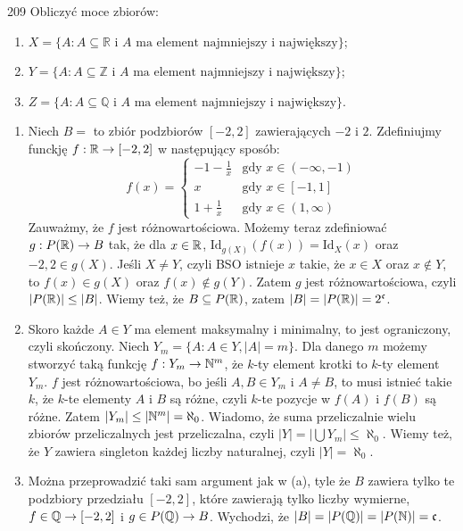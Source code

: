 \documentclass{../note}
\begin{document}
\begin{zadanie}{209}
Obliczyć moce zbiorów:
\begin{enumerate}[label=(\alph*)]
    \item $X=\{A : A \subseteq \mathbb{R} \text{ i } A \text{ ma element najmniejszy i największy}\}$;
    \item $Y=\{A : A \subseteq \mathbb{Z} \text{ i } A \text{ ma element najmniejszy i największy}\}$;
    \item $Z=\{A : A \subseteq \mathbb{Q} \text{ i } A \text{ ma element najmniejszy i największy}\}$.
\end{enumerate}
\end{zadanie}
\begin{rozwiazanie}
\begin{enumerate}[label=(\alph*)]
    \item Niech $B = $ to zbiór podzbiorów $[-2, 2]$ zawierających $-2$ i $2$. Zdefiniujmy funckję $f : \mathbb{R} \to [-2, 2]$ w następujący sposób:
    \[f(x) = \begin{cases}
        -1 - \frac1x & \text{gdy } x \in (-\infty, -1) \\
        x & \text{gdy } x \in [-1, 1] \\
        1 + \frac1x & \text{gdy } x \in (1, \infty)
    \end{cases}\]
    Zauważmy, że $f$ jest różnowartościowa. Możemy teraz zdefiniować $g : P(\mathbb{R}) \to B$ tak, że dla $x \in \mathbb{R}$, $\text{Id}_{g(X)}(f(x)) = \text{Id}_{X}(x)$ oraz $-2, 2 \in g(X)$. Jeśli $X \neq Y$, czyli BSO istnieje $x$ takie, że $x \in X $ oraz $x \notin Y$, to $f(x) \in g(X)$ oraz $f(x) \notin g(Y)$. Zatem $g$ jest różnowartościowa, czyli $|P(\mathbb{R})| \leq |B|$. Wiemy też, że $B \subseteq P(\mathbb{R})$, zatem $|B| = |P(\mathbb{R})| = 2^{\mathfrak{c}}$.
    \item Skoro każde $A \in Y$ ma element maksymalny i minimalny, to jest ograniczony, czyli skończony. Niech $Y_m = \{A : A \in Y, |A| = m\}$. Dla danego $m$ możemy stworzyć taką funkcję $f : Y_m \to \mathbb{N}^m$, że $k$-ty element krotki to $k$-ty element $Y_m$. $f$ jest różnowartościowa, bo jeśli $A, B \in Y_m$ i $A \neq B$, to musi istnieć takie $k$, że $k$-te elementy $A$ i $B$ są różne, czyli $k$-te pozycje w $f(A)$ i $f(B)$ są różne. Zatem $|Y_m| \leq |\mathbb{N}^m| = \aleph_0$. Wiadomo, że suma przeliczalnie wielu zbiorów przeliczalnych jest przeliczalna, czyli $|Y| = |\bigcup Y_m| \leq \aleph_0$. Wiemy też, że $Y$ zawiera singleton każdej liczby naturalnej, czyli $|Y| = \aleph_0$.
    \item Można przeprowadzić taki sam argument jak w (a), tyle że $B$ zawiera tylko te podzbiory przedziału $[-2, 2]$, które zawierają tylko liczby wymierne, $f \in \mathbb{Q} \to [-2, 2]$ i $g \in P(\mathbb{Q}) \to B$. Wychodzi, że $|B| = |P(\mathbb{Q})| = |P(\mathbb{N})| = \mathfrak{c}$.
\end{enumerate}
\end{rozwiazanie}
\end{document}
